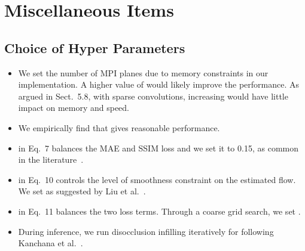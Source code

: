 \documentclass[preprint]{vgtc}
\def\etal{et al.}
\begin{document}
    \section{Miscellaneous Items}\label{sec:misc}
    \subsection{Choice of Hyper Parameters}
    \begin{itemize}
        \item We set the number of MPI planes  due to memory constraints in our implementation.
        A higher value of  would likely improve the performance.
        As argued in Sect.\ 5.8, with sparse convolutions, increasing  would have little impact on memory and speed.
        \item We empirically find that  gives reasonable performance.
        \item  in Eq.\ 7 balances the MAE and SSIM loss and we set it to 0.15, as common in the literature~\cite{godard2017unsupervised}.
        \item  in Eq.\ 10 controls the level of smoothness constraint on the estimated flow.
        We set  as suggested by Liu \etal~\cite{liu2020arflow}.
        \item  in Eq.\ 11 balances the two loss terms.
        Through a coarse grid search, we set .
        \item During inference, we run disocclusion infilling iteratively for  following Kanchana \etal~\cite{kanchana2022ivp}.
    \end{itemize}





\end{document}
